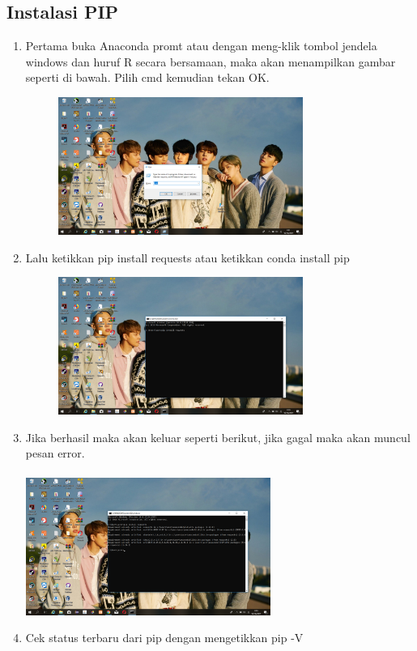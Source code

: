 \documentclass{article}
\begin{document}
\subsection{Instalasi PIP}
\begin{enumerate}
    \item Pertama buka Anaconda promt atau dengan meng-klik tombol jendela windows dan huruf R secara bersamaan, maka akan menampilkan gambar seperti di bawah. Pilih cmd kemudian tekan OK.
        \begin{figure}[h]
            \centerline{\includegraphics[width=8cm]{image/cmd.png}}
        \end{figure}
    \item Lalu ketikkan pip install requests atau ketikkan conda install pip
        \begin{figure}[h]
            \centerline{\includegraphics[width=8cm]{image/pip.png}}
        \end{figure}
    \item Jika berhasil maka akan keluar seperti berikut, jika gagal maka akan muncul pesan error.
            \paragraph{}
            \centerline{\includegraphics[width=8cm]{image/pipberhasil.png}}
    \item Cek status terbaru dari pip dengan mengetikkan pip -V
\end{enumerate}
\end{document}

